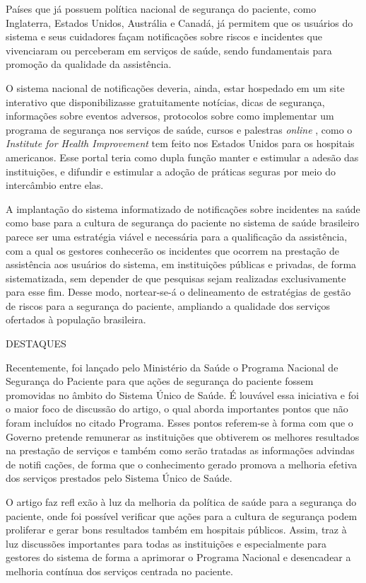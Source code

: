 \documentclass{article}
\begin{document}
Países que já possuem política nacional de segurança do paciente, como
Inglaterra, Estados
Unidos, Austrália e Canadá, já permitem que os usuários do sistema e seus
cuidadores façam
notificações sobre riscos e incidentes que vivenciaram ou perceberam em serviços
de saúde,
sendo fundamentais para promoção da qualidade da assistência.

O sistema nacional de notificações deveria, ainda, estar hospedado em um site
interativo
que disponibilizasse gratuitamente notícias, dicas de segurança, informações
sobre eventos
adversos, protocolos sobre como implementar um programa de segurança nos
serviços de saúde,
cursos e palestras \textit{online}
, como o \textit{Institute for Health
Improvement}
tem feito nos Estados Unidos para os hospitais americanos. Esse
portal teria como dupla função manter e estimular a adesão das instituições, e
difundir e
estimular a adoção de práticas seguras por meio do intercâmbio entre elas.

A implantação do sistema informatizado de notificações sobre incidentes na saúde
como base
para a cultura de segurança do paciente no sistema de saúde brasileiro parece
ser uma
estratégia viável e necessária para a qualificação da assistência, com a qual os
gestores
conhecerão os incidentes que ocorrem na prestação de assistência aos usuários do
sistema, em
instituições públicas e privadas, de forma sistematizada, sem depender de que
pesquisas
sejam realizadas exclusivamente para esse fim. Desse modo, nortear-se-á o
delineamento de
estratégias de gestão de riscos para a segurança do paciente, ampliando a
qualidade dos
serviços ofertados à população brasileira.

DESTAQUES

Recentemente, foi lançado pelo Ministério da Saúde o Programa Nacional de
Segurança do
Paciente para que ações de segurança do paciente fossem promovidas no âmbito do
Sistema
Único de Saúde. É louvável essa iniciativa e foi o maior foco de discussão do
artigo, o qual
aborda importantes pontos que não foram incluídos no citado Programa. Esses
pontos
referem-se à forma com que o Governo pretende remunerar as instituições que
obtiverem os
melhores resultados na prestação de serviços e também como serão tratadas as
informações
advindas de notifi cações, de forma que o conhecimento gerado promova a melhoria
efetiva dos
serviços prestados pelo Sistema Único de Saúde.

O artigo faz refl exão à luz da melhoria da política de saúde para a segurança
do paciente,
onde foi possível verificar que ações para a cultura de segurança podem
proliferar e gerar
bons resultados também em hospitais públicos. Assim, traz à luz discussões
importantes para
todas as instituições e especialmente para gestores do sistema de forma a
aprimorar o
Programa Nacional e desencadear a melhoria contínua dos serviços centrada no
paciente.
\end{document}

